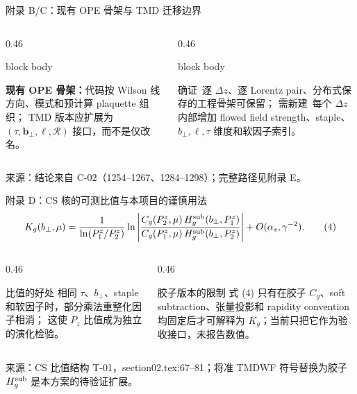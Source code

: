 \documentclass[UTF8,aspectratio=169,11pt]{ctexbeamer}
\newcommand{\source}[1]{%
  \par\vspace{0.05em}%
  {\raggedright\scriptsize\color{muted}来源：#1\par}}
\newcommand{\verified}{\textcolor{evidence}{确证}}
\newcommand{\newitem}{\textcolor{newblock}{需新建}}
\begin{document}
\begin{frame}[t]{附录 B/C：现有 OPE 骨架与 TMD 迁移边界}
  \begin{columns}[T,totalwidth=\textwidth]
    \begin{column}{0.46\textwidth}
      \begin{beamercolorbox}[wd=\linewidth,sep=0.55em,rounded=true]{block body}
        {\footnotesize
        \textbf{现有 OPE 骨架：}代码按 Wilson 线方向、模式和预计算 plaquette 组织；
        TMD 版本应扩展为 $(\tau,\boldsymbol b_\perp,\ell,\mathcal R)$ 接口，而不是仅改名。\par}
      \end{beamercolorbox}
    \end{column}
    \begin{column}{0.46\textwidth}
      \begin{beamercolorbox}[wd=\linewidth,sep=0.55em,rounded=true]{block body}
        {\footnotesize
        \verified\ 逐 $\Delta z$、逐 Lorentz pair、分布式保存的工程骨架可保留；
        \newitem\ 每个 $\Delta z$ 内部增加 flowed field strength、staple、
        $b_\perp,\ell,\tau$ 维度和软因子索引。\par}
      \end{beamercolorbox}
    \end{column}
  \end{columns}
  \source{结论来自 C-02（1254--1267、1284--1298）；完整路径见附录 E。}
\end{frame}

\begin{frame}[t]{附录 D：CS 核的可测比值与本项目的谨慎用法}
  \begin{equation*}
    K_g(b_\perp,\mu)
    =
    \frac{1}{\ln(P_1^z/P_2^z)}
    \ln\left|
    \frac{C_g(P_2^z,\mu)\,H_g^{\rm sub}(b_\perp,P_1^z)}
         {C_g(P_1^z,\mu)\,H_g^{\rm sub}(b_\perp,P_2^z)}
    \right|
    +O(\alpha_s,\gamma^{-2}).
    \tag{4}
  \end{equation*}
  \begin{columns}[T,totalwidth=\textwidth]
    \begin{column}{0.46\textwidth}
      \begin{block}{比值的好处}
        相同 $\tau$、$b_\perp$、staple 和软因子时，部分乘法重整化因子相消；
        这使 $P_z$ 比值成为独立的演化检验。
      \end{block}
    \end{column}
    \begin{column}{0.46\textwidth}
      \begin{block}{胶子版本的限制}
        式 (4) 只有在胶子 $C_g$、soft subtraction、张量投影和 rapidity convention
        均固定后才可解释为 $K_g$；当前只把它作为验收接口，未报告数值。
      \end{block}
    \end{column}
  \end{columns}
  \source{CS 比值结构 T-01，section02.tex:67--81；将准 TMDWF 符号替换为胶子 $H_g^{\rm sub}$ 是本方案的待验证扩展。}
\end{frame}
\end{document}
